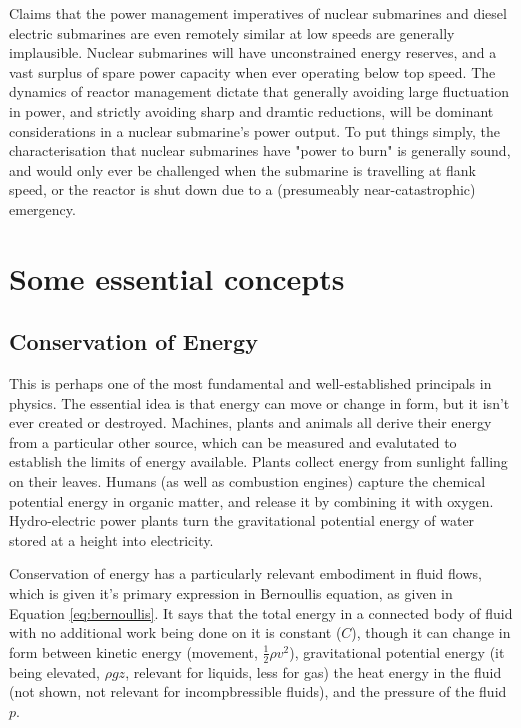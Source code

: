 \documentclass{article}\usepackage[]{graphicx}\usepackage[]{color}
\begin{document}
Claims that the power management imperatives of nuclear submarines and diesel electric submarines are even remotely similar at low speeds are generally implausible.  Nuclear submarines will have unconstrained energy reserves, and a vast surplus of spare power capacity when ever operating below top speed.  The dynamics of reactor management dictate that generally avoiding large fluctuation in power, and strictly avoiding sharp and dramtic reductions, will be dominant considerations in a nuclear submarine's power output.  To put things simply, the characterisation that nuclear submarines have "power to burn" is generally sound, and would only ever be challenged when the submarine is travelling at flank speed, or the reactor is shut down due to a (presumeably near-catastrophic) emergency.

\section{Some essential concepts}

\subsection{Conservation of Energy}

This is perhaps one of the most fundamental and well-established principals in physics.  The essential idea is that energy can move or change in form, but it isn't ever created or destroyed.  Machines, plants and animals all derive their energy from a particular other source, which can be measured and evalutated to establish the limits of energy available.  Plants collect energy from sunlight falling on their leaves. Humans (as well as combustion engines) capture the chemical potential energy in organic matter, and release it by combining it with oxygen.  Hydro-electric power plants turn the gravitational potential energy of water stored at a height into electricity.

Conservation of energy has a particularly relevant embodiment in fluid flows, which is given it's primary expression in Bernoullis equation, as given in Equation \ref{eq:bernoullis}.  It says that the total energy in a connected body of fluid with no additional work being done on it is constant ($C$), though it can change in form between kinetic energy (movement, $\frac{1}{2}\rho v^2$), gravitational potential energy (it being elevated, $\rho gz$, relevant for liquids, less for gas) the heat energy in the fluid (not shown, not relevant for incompbressible fluids), and the pressure of the fluid $p$.
\end{document}
